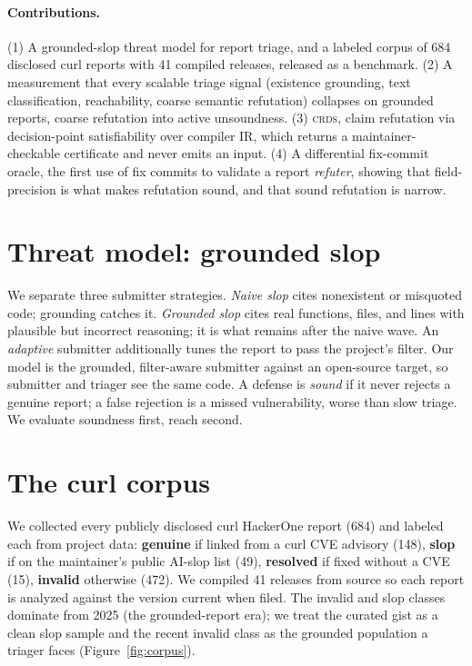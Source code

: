 \documentclass[11pt]{article}
\newcommand{\crds}{\textsc{crds}}
\begin{document}
\paragraph{Contributions.} (1) A grounded-slop threat model for report triage, and a labeled corpus of 684
disclosed curl reports with 41 compiled releases, released as a benchmark. (2) A measurement that every scalable
triage signal (existence grounding, text classification, reachability, coarse semantic refutation) collapses on
grounded reports, coarse refutation into active unsoundness. (3) \crds{}, claim refutation via decision-point
satisfiability over compiler IR, which returns a maintainer-checkable certificate and never emits an input. (4) A
differential fix-commit oracle, the first use of fix commits to validate a report \emph{refuter}, showing that
field-precision is what makes refutation sound, and that sound refutation is narrow.

\section{Threat model: grounded slop}
We separate three submitter strategies. \emph{Naive slop} cites nonexistent or misquoted code; grounding catches it.
\emph{Grounded slop} cites real functions, files, and lines with plausible but incorrect reasoning; it is what
remains after the naive wave. An \emph{adaptive} submitter additionally tunes the report to pass the project's
filter. Our model is the grounded, filter-aware submitter against an open-source target, so submitter and triager
see the same code. A defense is \emph{sound} if it never rejects a genuine report; a false rejection is a missed
vulnerability, worse than slow triage. We evaluate soundness first, reach second.

\section{The curl corpus}
We collected every publicly disclosed curl HackerOne report (684) and labeled each from project data: \textbf{genuine}
if linked from a curl CVE advisory (148), \textbf{slop} if on the maintainer's public AI-slop list (49),
\textbf{resolved} if fixed without a CVE (15), \textbf{invalid} otherwise (472). We compiled 41 releases from source
so each report is analyzed against the version current when filed. The invalid and slop classes dominate from 2025
(the grounded-report era); we treat the curated gist as a clean slop sample and the recent invalid class as the
grounded population a triager faces (Figure~\ref{fig:corpus}).
\end{document}
